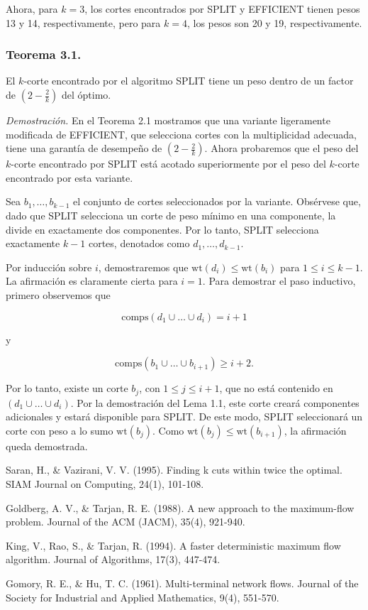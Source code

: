 \documentclass{article}
\begin{document}
Ahora, para \( k = 3 \), los cortes encontrados por SPLIT y EFFICIENT tienen pesos 13 y 14, respectivamente, pero para \( k = 4 \), los pesos son 20 y 19, respectivamente.

\subsubsection*{Teorema 3.1.} 
El \( k \)-corte encontrado por el algoritmo SPLIT tiene un peso dentro de un factor de \( (2 - \frac{2}{k}) \) del óptimo.

\textit{Demostración.} En el Teorema 2.1 mostramos que una variante ligeramente modificada de EFFICIENT, que selecciona cortes con la multiplicidad adecuada, tiene una garantía de desempeño de \( (2 - \frac{2}{k}) \). Ahora probaremos que el peso del \( k \)-corte encontrado por SPLIT está acotado superiormente por el peso del \( k \)-corte encontrado por esta variante.

Sea \( b_1, \dots, b_{k-1} \) el conjunto de cortes seleccionados por la variante. Obsérvese que, dado que SPLIT selecciona un corte de peso mínimo en una componente, la divide en exactamente dos componentes. Por lo tanto, SPLIT selecciona exactamente \( k - 1 \) cortes, denotados como \( d_1, \dots, d_{k-1} \).

Por inducción sobre \( i \), demostraremos que \( \text{wt}(d_i) \leq \text{wt}(b_i) \) para \( 1 \leq i \leq k - 1 \). La afirmación es claramente cierta para \( i = 1 \). Para demostrar el paso inductivo, primero observemos que

\[
\text{comps}(d_1 \cup \dots \cup d_i) = i + 1
\]

y

\[
\text{comps}(b_1 \cup \dots \cup b_{i+1}) \geq i + 2.
\]

Por lo tanto, existe un corte \( b_j \), con \( 1 \leq j \leq i + 1 \), que no está contenido en \( (d_1 \cup \dots \cup d_i) \). Por la demostración del Lema 1.1, este corte creará componentes adicionales y estará disponible para SPLIT. De este modo, SPLIT seleccionará un corte con peso a lo sumo \( \text{wt}(b_j) \). Como \( \text{wt}(b_j) \leq \text{wt}(b_{i+1}) \), la afirmación queda demostrada.

\begin{thebibliography}{9}
Saran, H., \& Vazirani, V. V. (1995). Finding k cuts within twice the optimal. SIAM Journal on Computing, 24(1), 101-108.

Goldberg, A. V., \& Tarjan, R. E. (1988). A new approach to the maximum-flow problem. Journal of the ACM (JACM), 35(4), 921-940.

King, V., Rao, S., \& Tarjan, R. (1994). A faster deterministic maximum flow algorithm. Journal of Algorithms, 17(3), 447-474.

Gomory, R. E., \& Hu, T. C. (1961). Multi-terminal network flows. Journal of the Society for Industrial and Applied Mathematics, 9(4), 551-570.
\end{thebibliography}
\end{document}
